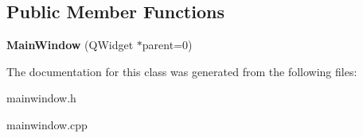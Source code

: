 \subsection*{Public Member Functions}
\begin{DoxyCompactItemize}
\item 
\mbox{\label{class_main_window_a8b244be8b7b7db1b08de2a2acb9409db}} 
{\bfseries Main\+Window} (Q\+Widget $\ast$parent=0)
\end{DoxyCompactItemize}


The documentation for this class was generated from the following files\+:\begin{DoxyCompactItemize}
\item 
mainwindow.\+h\item 
mainwindow.\+cpp\end{DoxyCompactItemize}
